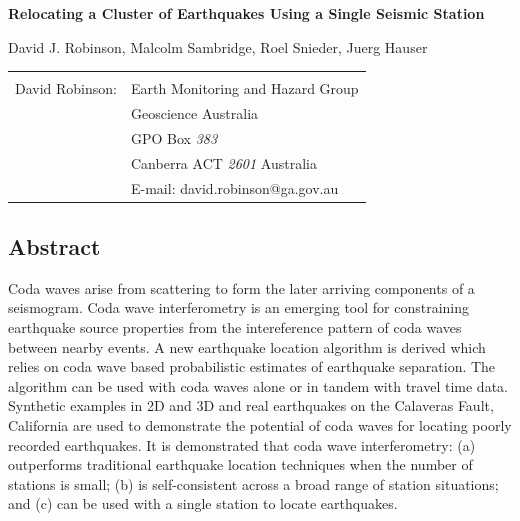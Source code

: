 \documentclass[12pt,double]{article}
\begin{document}
\begin{centering}
\LARGE{\textbf{Relocating a Cluster of Earthquakes Using a Single Seismic Station}} \\  
\end{centering}
\vspace{3em}
\begin{centering}
David J. Robinson, Malcolm Sambridge, Roel Snieder, Juerg Hauser \\
\end{centering}

\vspace{7em}
\begin{tabular}{lp{}}
 & \\
David Robinson: & Earth Monitoring and Hazard Group \\
 &  Geoscience Australia \\
 & GPO Box \emph{383} \\
 & Canberra ACT \emph{2601} Australia \\
 & E-mail: david.robinson@ga.gov.au\\
\end{tabular}

\clearpage
\label{firstpage}


\vspace{2em}
\begin{centering}
\section*{Abstract}
\end{centering}
Coda waves arise from scattering to form the later arriving
components of a seismogram. Coda wave interferometry is an emerging
tool for constraining earthquake source properties from the
intereference pattern of coda waves between nearby events. A new
earthquake location algorithm is derived which relies on coda wave
based probabilistic estimates of earthquake separation. The
algorithm can be used with coda waves alone or in tandem with travel
time data. Synthetic examples in 2D and 3D and real earthquakes on
the Calaveras Fault, California are used to demonstrate the
potential of coda waves for locating poorly recorded earthquakes. It
is demonstrated that coda wave interferometry: (a) outperforms
traditional earthquake location techniques when the number of
stations is small; (b) is self-consistent across a broad range of
station situations; and (c) can be used with a single station to
locate earthquakes.
\end{document}
